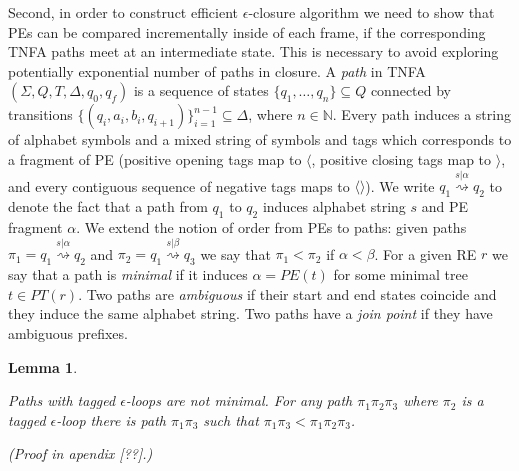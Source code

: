 \documentclass[AMA,STIX1COL]{WileyNJD-v2}
\newcommand{\Xl}{\langle}
\newcommand{\Xr}{\rangle}
\newcommand{\Xm}{\langle\!\rangle}
\newcommand{\YN}{\mathbb{N}}
\newcommand{\PT}{PT}
\newcommand{\PE}{P\!E}
\newtheorem{XLem}{Lemma}
\begin{document}
Second, in order to construct efficient $\epsilon$-closure algorithm
we need to show that PEs can be compared incrementally inside of each frame,
if the corresponding TNFA paths meet at an intermediate state.
This is necessary to avoid exploring potentially exponential number of paths in closure.
%
A \emph{path} in TNFA $(\Sigma, Q, T, \Delta, q_0, q_f)$
is a sequence of states $\{q_1, \hdots, q_n\} \subseteq Q$
connected by transitions $\{(q_i, a_i, b_i, q_{i + 1})\}_{i=1}^{n-1} \subseteq \Delta$, where $n \in \YN$.
%
Every path induces a string of alphabet symbols
and a mixed string of symbols and tags which corresponds to a fragment of PE
(positive opening tags map to $\Xl$, positive closing tags map to $\Xr$,
and every contiguous sequence of negative tags maps to $\Xm$).
We write $q_1 \overset {s|\alpha} {\rightsquigarrow} q_2$
to denote the fact that a path from $q_1$ to $q_2$ induces alphabet string $s$ and PE fragment $\alpha$.
%
We extend the notion of order from PEs to paths: given paths
$\pi_1 = q_1 \overset {s|\alpha} {\rightsquigarrow} q_2$ and
$\pi_2 = q_1 \overset {s|\beta} {\rightsquigarrow} q_3$
we say that $\pi_1 < \pi_2$ if $\alpha < \beta$.
%
For a given RE $r$ we say that a path is \emph{minimal} if it induces
$\alpha = \PE(t)$ for some minimal tree $t \in \PT(r)$.
%
Two paths are \emph{ambiguous} if their start and end states coincide and they induce the same alphabet string.
Two paths have a \emph{join point} if they have ambiguous prefixes.
%

\newcommand \lemmaclosureminpaths {
\emph{Paths with tagged $\epsilon$-loops are not minimal.}
    For any path $\pi_1 \pi_2 \pi_3$ where $\pi_2$ is a tagged $\epsilon$-loop
    there is path $\pi_1 \pi_3$
    such that $\pi_1 \pi_3 < \pi_1 \pi_2 \pi_3$.
}
\begin{XLem}\label{lemma_closure_minpaths}
\lemmaclosureminpaths
(Proof in apendix [??].)
\end{XLem}
\end{document}
